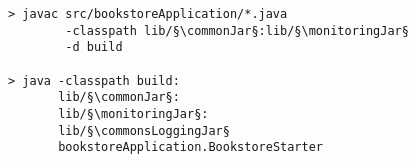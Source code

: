\begin{lstlisting}[caption=Compile and run under Linux]
> javac src/bookstoreApplication/*.java
        -classpath lib/§\commonJar§:lib/§\monitoringJar§
        -d build

> java -classpath build:
       lib/§\commonJar§:
       lib/§\monitoringJar§:
       lib/§\commonsLoggingJar§
       bookstoreApplication.BookstoreStarter 
\end{lstlisting}
